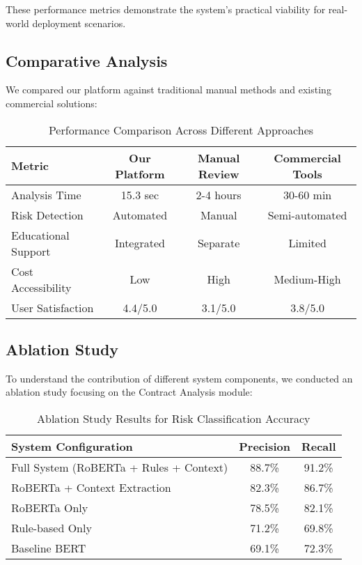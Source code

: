 These performance metrics demonstrate the system's practical viability for real-world deployment scenarios.

\subsection{Comparative Analysis}

We compared our platform against traditional manual methods and existing commercial solutions:

\begin{table}[htbp]
\caption{Performance Comparison Across Different Approaches}
\begin{center}
\begin{tabular}{|l|c|c|c|}
\hline
\textbf{Metric} & \textbf{Our Platform} & \textbf{Manual Review} & \textbf{Commercial Tools} \\
\hline
Analysis Time & 15.3 sec & 2-4 hours & 30-60 min \\
Risk Detection & Automated & Manual & Semi-automated \\
Educational Support & Integrated & Separate & Limited \\
Cost Accessibility & Low & High & Medium-High \\
User Satisfaction & 4.4/5.0 & 3.1/5.0 & 3.8/5.0 \\
\hline
\end{tabular}
\label{tab:comparison}
\end{center}
\end{table}

\subsection{Ablation Study}

To understand the contribution of different system components, we conducted an ablation study focusing on the Contract Analysis module:

\begin{table}[htbp]
\caption{Ablation Study Results for Risk Classification Accuracy}
\begin{center}
\begin{tabular}{|l|c|c|}
\hline
\textbf{System Configuration} & \textbf{Precision} & \textbf{Recall} \\
\hline
Full System (RoBERTa + Rules + Context) & 88.7\% & 91.2\% \\
RoBERTa + Context Extraction & 82.3\% & 86.7\% \\
RoBERTa Only & 78.5\% & 82.1\% \\
Rule-based Only & 71.2\% & 69.8\% \\
Baseline BERT & 69.1\% & 72.3\% \\
\hline
\end{tabular}
\label{tab:ablation}
\end{center}
\end{table}

